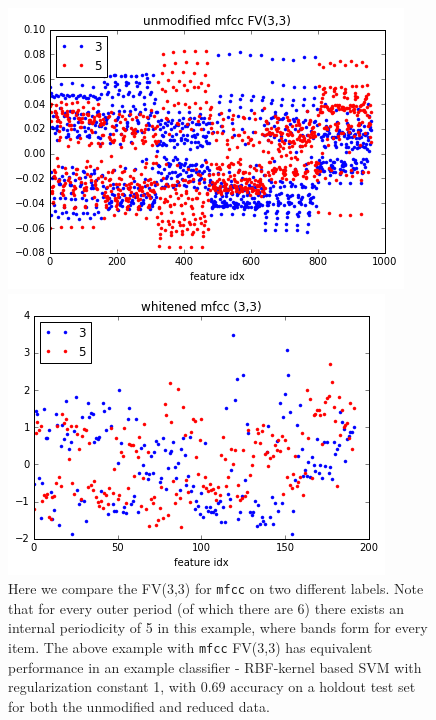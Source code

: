 \documentclass{article}
\begin{document}
\begin{figure}[H]
    \centering
    
    \begin{minipage}[b]{0.3\textwidth}
        \includegraphics[width=\textwidth]{unmodified-mfcc3-3.png}
    \end{minipage}
    \hfill
    \begin{minipage}[b]{0.3\textwidth}
        \includegraphics[width=\textwidth]{whitened-riffled-mfcc3-3.png}
    \end{minipage}
    
    \label{fig:fv33}
    \caption{Here we compare the FV(3,3) for \texttt{mfcc} on two different labels. Note that for every outer period (of which there are 6) there exists an internal periodicity of 5 in this example, where bands form for every item. The above example with \texttt{mfcc} FV(3,3) has equivalent performance in an example classifier - RBF-kernel based SVM with regularization constant 1, with 0.69 accuracy on a holdout test set for both the unmodified and reduced data.}
\end{figure}
\end{document}
